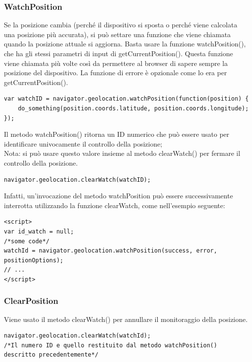 \documentclass[italian]{article}
\begin{document}
\subsubsection{WatchPosition}
Se la posizione cambia (perché il dispositivo si sposta o perché viene calcolata una posizione più accurata), si può settare una funzione che viene chiamata quando la posizione attuale si aggiorna. Basta usare la funzione watchPosition(), che ha gli stessi parametri di input di getCurrentPosition(). Questa funzione viene chiamata più volte così da permettere al browser di sapere sempre la posizione del dispositivo. La funzione di errore è opzionale come lo era per getCurrentPosition().

\begin{lstlisting}
var watchID = navigator.geolocation.watchPosition(function(position) {
	do_something(position.coords.latitude, position.coords.longitude);
});
\end{lstlisting}
Il metodo watchPosition() ritorna un ID numerico che può essere usato per identificare univocamente il controllo della posizione; 
\\
Nota: si può usare questo valore insieme al metodo clearWatch() per fermare il controllo della posizione.
\begin{lstlisting}
navigator.geolocation.clearWatch(watchID);
\end{lstlisting}
Infatti, un'invocazione del metodo watchPosition può essere successivamente interrotta utilizzando la funzione clearWatch, 
come nell’esempio seguente:
\begin{lstlisting}
<script> 
var id_watch = null;
/*some code*/
watchId = navigator.geolocation.watchPosition(success, error, positionOptions);
// ...
</script> 
\end{lstlisting}
\subsubsection{ClearPosition}
Viene usato il metodo clearWatch() per annullare il monitoraggio della posizione.
\begin{lstlisting}
navigator.geolocation.clearWatch(watchId);
/*Il numero ID e quello restituito dal metodo watchPosition() descritto precedentemente*/
\end{lstlisting}
\end{document}
